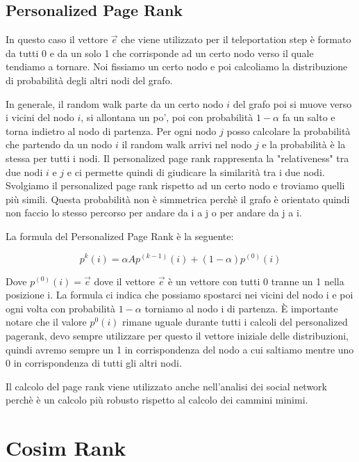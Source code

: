\documentclass[14pt]{extreport}
\begin{document}
\subsection{Personalized Page Rank}

In questo caso il vettore $\vec{e}$ che viene utilizzato per il teleportation step è formato da tutti 0 e da un solo 1 che corrisponde ad un certo nodo verso il quale tendiamo a tornare. Noi fissiamo un certo nodo e poi calcoliamo la distribuzione di probabilità degli altri nodi del grafo.

In generale, il random walk parte da un certo nodo $i$ del grafo poi si muove verso i vicini del nodo $i$, si allontana un po', poi con probabilità $1-\alpha$ fa un salto e torna indietro al nodo di partenza.
Per ogni nodo $j$ posso calcolare la probabilità che partendo da un nodo $i$ il random walk arrivi nel nodo $j$ e la probabilità è la stessa per tutti i nodi.
Il personalized page rank rappresenta la "relativeness" tra due nodi $i$ e $j$ e ci permette quindi di giudicare la similarità tra i due nodi. Svolgiamo il personalized page rank rispetto ad un certo nodo e troviamo quelli più simili.
Questa probabilità non è simmetrica perchè il grafo è orientato quindi non faccio lo stesso percorso per andare da i a j o per andare da j a i.

La formula del Personalized Page Rank è la seguente:

\newline
\begin{equation}
    p^k(i) = \alpha Ap^{(k-1)}(i) + (1-\alpha)p^{(0)}(i)
\end{equation}

Dove $p^{(0)}(i) = \vec{e}$ dove il vettore $\vec{e}$ è un vettore con tutti 0 tranne un 1 nella posizione i. La formula ci indica che possiamo spostarci nei vicini del nodo i e poi ogni volta con probabilità $1-\alpha$ torniamo al nodo i di partenza.
È importante notare che il valore $p^0(i)$ rimane uguale durante tutti i calcoli del personalized pagerank, devo sempre utilizzare per questo il vettore iniziale delle distribuzioni, quindi avremo sempre un 1 in corrispondenza del nodo a cui saltiamo mentre uno 0 in corrispondenza di tutti gli altri nodi.

Il calcolo del page rank viene utilizzato anche nell'analisi dei social network perchè è un calcolo più robusto rispetto al calcolo dei cammini minimi.

\section{Cosim Rank}
\end{document}
